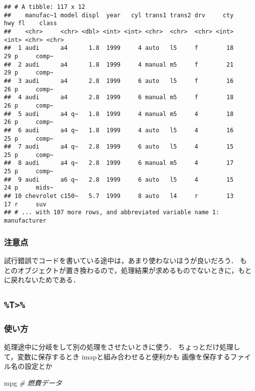 \documentclass[
]{article}
\newenvironment{Shaded}{\begin{snugshade}}{\end{snugshade}}
\newcommand{\CommentTok}[1]{\textcolor[rgb]{0.56,0.35,0.01}{\textit{#1}}}
\newcommand{\NormalTok}[1]{#1}
\begin{document}
\begin{verbatim}
## # A tibble: 117 x 12
##    manufac~1 model displ  year   cyl trans1 trans2 drv     cty   hwy fl    class
##    <chr>     <chr> <dbl> <int> <int> <chr>  <chr>  <chr> <int> <int> <chr> <chr>
##  1 audi      a4      1.8  1999     4 auto   l5     f        18    29 p     comp~
##  2 audi      a4      1.8  1999     4 manual m5     f        21    29 p     comp~
##  3 audi      a4      2.8  1999     6 auto   l5     f        16    26 p     comp~
##  4 audi      a4      2.8  1999     6 manual m5     f        18    26 p     comp~
##  5 audi      a4 q~   1.8  1999     4 manual m5     4        18    26 p     comp~
##  6 audi      a4 q~   1.8  1999     4 auto   l5     4        16    25 p     comp~
##  7 audi      a4 q~   2.8  1999     6 auto   l5     4        15    25 p     comp~
##  8 audi      a4 q~   2.8  1999     6 manual m5     4        17    25 p     comp~
##  9 audi      a6 q~   2.8  1999     6 auto   l5     4        15    24 p     mids~
## 10 chevrolet c150~   5.7  1999     8 auto   l4     r        13    17 r     suv  
## # ... with 107 more rows, and abbreviated variable name 1: manufacturer
\end{verbatim}

\hypertarget{ux6ce8ux610fux70b9}{%
\subsubsection{注意点}\label{ux6ce8ux610fux70b9}}

試行錯誤でコードを書いている途中は，あまり使わないほうが良いだろう．
もとのオブジェクトが置き換わるので，処理結果が求めるものでないときに，もとに戻れないためである．

\hypertarget{t}{%
\subsection{\texorpdfstring{\texttt{\%T\textgreater{}\%}}{\%T\textgreater\%}}\label{t}}

\hypertarget{ux4f7fux3044ux65b9-1}{%
\subsubsection{使い方}\label{ux4f7fux3044ux65b9-1}}

処理途中に分岐をして別の処理をさせたいときに使う．
ちょっとだけ処理して，変数に保存するとき
imapと組み合わせると便利かも
画像を保存するファイル名の設定とか

\begin{Shaded}
\begin{Highlighting}[]
\NormalTok{mpg }\CommentTok{\# 燃費データ}
\end{Highlighting}
\end{Shaded}
\end{document}
